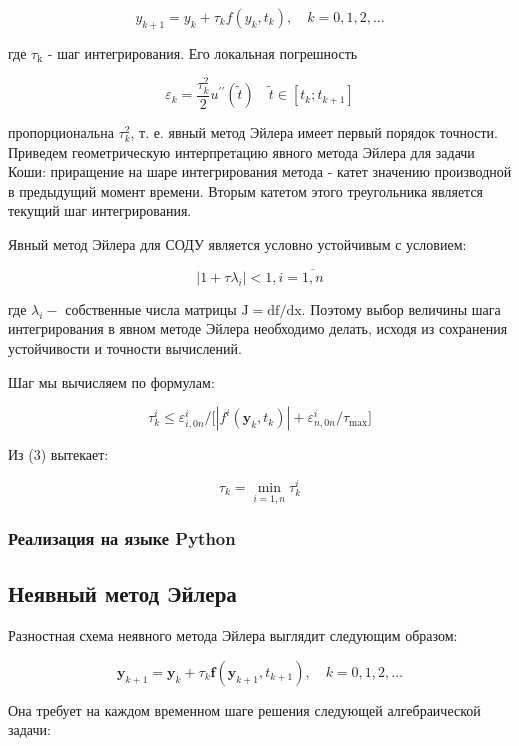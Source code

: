 \documentclass[a4paper]{article}
\begin{document}
{{{{{{{{$$
y_{k+1}=y_{k}+\tau_{k} f\left(y_{k}, t_{k}\right), \quad k=0,1,2, \ldots
$$

где $\tau_{\mathrm{k}}$ - шаг интегрирования. Его локальная погрешность

$$
\varepsilon_{k}=\frac{\tau_{k}^{2}}{2} u^{\prime \prime}(\tilde{t}) \quad \tilde{t} \in\left[t_{k} ; t_{k+1}\right]
$$

пропорциональна $\tau_{k}^{2}$, т. е. явный метод Эйлера имеет первый порядок точности. Приведем геометрическую интерпретацию явного метода Эйлера для задачи Коши: приращение на шаре интегрирования метода - катет значению производной в предыдущий момент времени. Вторым катетом этого треугольника является текущий шаг интегрирования.

Явный метод Эйлера для СОДУ является условно устойчивым с условием:

$$
\left|1+\tau \lambda_{i}\right|<1, i=\overline{1, n}
$$

где $\lambda_{i}-$ собственные числа матрицы $\mathrm{J}=\mathrm{df} / \mathrm{dx}$. Поэтому выбор величины шага интегрирования в явном методе Эйлера необходимо делать, исходя из сохранения устойчивости и точности вычислений.

Шаг мы вычисляем по формулам:

$$
\tau_{k}^{i}\leq\varepsilon_{i,0n}^{i}/ \big[|f^{i}(\mathbf{y}_{k},t_{k})|+\varepsilon_{n,0n}^{i}/\tau_{\mathrm{max}}\big]
$$

Из (3) вытекает:

$$
\tau_{k}=\min _{i=1, n} \tau_{k}^{i}
$$

\subsubsection{Реализация на языке Python}



\subsection{Неявный метод Эйлера}
Разностная схема неявного метода Эйлера выглядит следующим образом:

$$
\mathbf{y}_{k+1}=\mathbf{y}_{k}+\tau_{k} \mathbf{f}\left(\mathbf{y}_{k+1}, t_{k+1}\right), \quad k=0,1,2, \ldots
$$

Она требует на каждом временном шаге решения следующей алгебраической задачи:

}}}}}}}}
\end{document}
